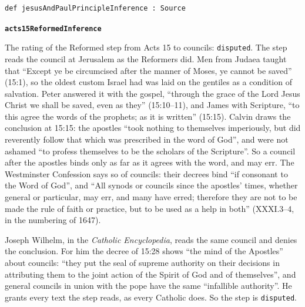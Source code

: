 \documentclass[11pt]{article}
\begin{document}
{\small\begin{verbatim}
def jesusAndPaulPrincipleInference : Source
\end{verbatim}}
\par\medskip\noindent\textbf{\texttt{acts15\allowbreak{}Reformed\allowbreak{}Inference}}\par\nobreak\noindent
The rating of the Reformed step from Acts 15 to councils: \texttt{disputed}. The step reads the council at Jerusalem as the Reformers did. Men from Judaea taught that “Except ye be circumcised after the manner of Moses, ye cannot be saved” (15:1), so the oldest custom Israel had was laid on the gentiles as a condition of salvation. Peter answered it with the gospel, “through the grace of the Lord Jesus Christ we shall be saved, even as they” (15:10–11), and James with Scripture, “to this agree the words of the prophets; as it is written” (15:15). Calvin draws the conclusion at 15:15: the apostles “took nothing to themselves imperiously, but did reverently follow that which was prescribed in the word of God”, and were not ashamed “to profess themselves to be the scholars of the Scripture”. So a council after the apostles binds only as far as it agrees with the word, and may err. The Westminster Confession says so of councils: their decrees bind “if consonant to the Word of God”, and “All synods or councils since the apostles’ times, whether general or particular, may err, and many have erred; therefore they are not to be made the rule of faith or practice, but to be used as a help in both” (XXXI.3–4, in the numbering of 1647).

Joseph Wilhelm, in the \emph{Catholic Encyclopedia}, reads the same council and denies the conclusion. For him the decree of 15:28 shows “the mind of the Apostles” about councils: “they put the seal of supreme authority on their decisions in attributing them to the joint action of the Spirit of God and of themselves”, and general councils in union with the pope have the same “infallible authority”. He grants every text the step reads, as every Catholic does. So the step is \texttt{disputed}.
\end{document}
